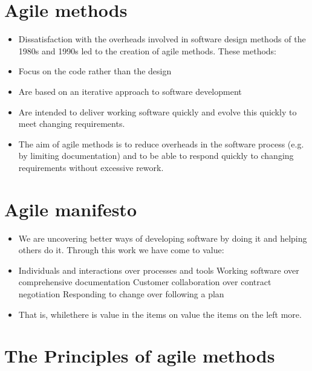 \section{ Agile methods}
\begin{itemize}

\item Dissatisfaction with the overheads involved in software design methods of the 1980s and 1990s led to the creation of agile methods. These methods:

\item Focus on the code rather than the design

\item Are based on an iterative approach to software development

\item Are intended to deliver working software quickly and evolve this quickly to meet changing requirements.

\item The aim of agile methods is to reduce overheads in the software process (e.g. by limiting documentation) and to be able to respond quickly to changing requirements without excessive rework.


\end{itemize}
\section{ Agile manifesto}
\begin{itemize}

\item We are uncovering better ways of developing software by doing it and helping others do it. Through this work we have come to value:

\item Individuals and interactions over processes and tools Working software over comprehensive documentation Customer collaboration over contract negotiation Responding to change over following a plan
\item That is, whilethere is value in the items on value the items on the left more.

\end{itemize}
\section{The Principles of agile methods}


